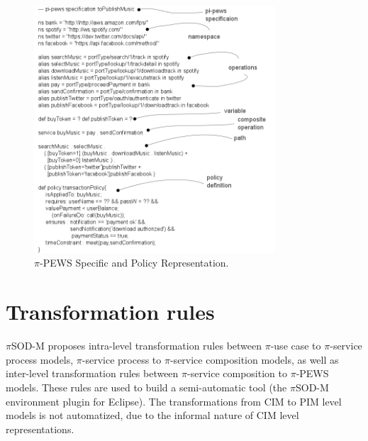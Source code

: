 \documentclass[12pt,twoside]{article}
\theoremstyle{plain}
\theoremstyle{plain}
\newcommand{\pisodm}[0]{$\pi$SOD-M\xspace}
\begin{document}
\begin{multicols}{2}
\begin{figure}
\centering
\includegraphics[width=0.8\textwidth]{pi-pewsSpecification-toPublishMusic}
\caption{$\pi$-PEWS Specific and Policy Representation.}
\label{fig:Specific-Contract-Representation}
\end{figure}


\section{Transformation rules}\label{sec:mmrules}



\pisodm  proposes intra-level transformation rules between $\pi$-use case to $\pi$-service process models, $\pi$-service process to $\pi$-service composition  models, as well as inter-level transformation rules between $\pi$-service composition to $\pi$-PEWS models. 
These rules are used to build a semi-automatic tool (the \pisodm environment plugin for Eclipse).
The transformations from CIM to PIM level models is not automatized, due to the informal nature of CIM level representations.
 

\end{multicols}
\end{document}
